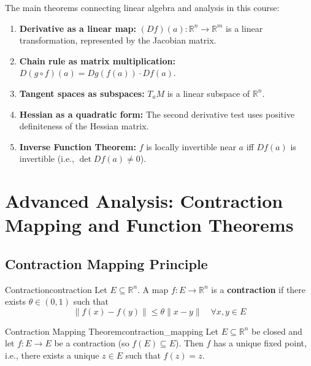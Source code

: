 \documentclass[11pt, letterpaper, openany]{book}
\begin{document}
\begin{remark}
The main theorems connecting linear algebra and analysis in this course:
\begin{enumerate}
    \item \textbf{Derivative as a linear map:} $(Df)(a): \mathbb{R}^n \to \mathbb{R}^m$ is a linear transformation, represented by the Jacobian matrix.
    \item \textbf{Chain rule as matrix multiplication:} $D(g \circ f)(a) = Dg(f(a)) \cdot Df(a)$.
    \item \textbf{Tangent spaces as subspaces:} $T_a M$ is a linear subspace of $\mathbb{R}^n$.
    \item \textbf{Hessian as a quadratic form:} The second derivative test uses positive definiteness of the Hessian matrix.
    \item \textbf{Inverse Function Theorem:} $f$ is locally invertible near $a$ iff $Df(a)$ is invertible (i.e., $\det Df(a) \neq 0$).
\end{enumerate}
\end{remark}

\section{Advanced Analysis: Contraction Mapping and Function Theorems}

\subsection{Contraction Mapping Principle}

\begin{defn}{Contraction}{contraction}
Let $E \subseteq \mathbb{R}^n$. A map $f: E \to \mathbb{R}^n$ is a \textbf{contraction} if there exists $\theta \in (0, 1)$ such that
\[\|f(x) - f(y)\| \leq \theta \|x - y\| \quad \forall x, y \in E\]
\end{defn}

\begin{thm}{Contraction Mapping Theorem}{contraction_mapping}
Let $E \subseteq \mathbb{R}^n$ be closed and let $f: E \to E$ be a contraction (so $f(E) \subseteq E$). Then $f$ has a unique fixed point, i.e., there exists a unique $z \in E$ such that $f(z) = z$.
\end{thm}
\end{document}
